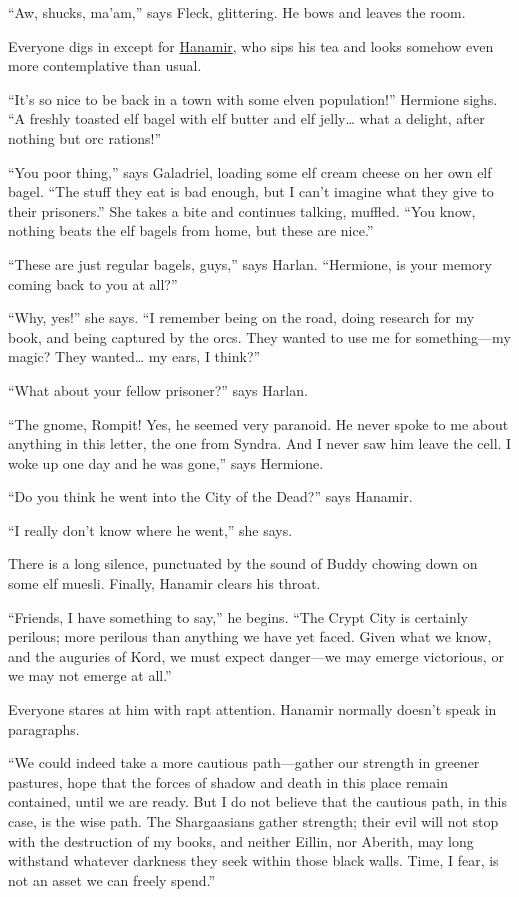 \documentclass[smalldemyvopaper,11pt,twoside,onecolumn,openright,extrafontsizes]{memoir}
\begin{document}
``Aw, shucks, ma'am,'' says Fleck, glittering. He bows and leaves the
room.

Everyone digs in except for \href{/characters/hanamir/}{Hanamir}, who
sips his tea and looks somehow even more contemplative than usual.

``It's so nice to be back in a town with some elven population!''
Hermione sighs. ``A freshly toasted elf bagel with elf butter and elf
jelly\ldots{} what a delight, after nothing but orc rations!''

``You poor thing,'' says Galadriel, loading some elf cream cheese on her
own elf bagel. ``The stuff they eat is bad enough, but I can't imagine
what they give to their prisoners.'' She takes a bite and continues
talking, muffled. ``You know, nothing beats the elf bagels from home,
but these are nice.''

``These are just regular bagels, guys,'' says Harlan. ``Hermione, is
your memory coming back to you at all?''

``Why, yes!'' she says. ``I remember being on the road, doing research
for my book, and being captured by the orcs. They wanted to use me for
something---my magic? They wanted\ldots{} my ears, I think?''

``What about your fellow prisoner?'' says Harlan.

``The gnome, Rompit! Yes, he seemed very paranoid. He never spoke to me
about anything in this letter, the one from Syndra. And I never saw him
leave the cell. I woke up one day and he was gone,'' says Hermione.

``Do you think he went into the City of the Dead?'' says Hanamir.

``I really don't know where he went,'' she says.

There is a long silence, punctuated by the sound of Buddy chowing down
on some elf muesli. Finally, Hanamir clears his throat.

``Friends, I have something to say,'' he begins. ``The Crypt City is
certainly perilous; more perilous than anything we have yet faced. Given
what we know, and the auguries of Kord, we must expect danger---we may
emerge victorious, or we may not emerge at all.''

Everyone stares at him with rapt attention. Hanamir normally doesn't
speak in paragraphs.

``We could indeed take a more cautious path---gather our strength in
greener pastures, hope that the forces of shadow and death in this place
remain contained, until we are ready. But I do not believe that the
cautious path, in this case, is the wise path. The Shargaasians gather
strength; their evil will not stop with the destruction of my books, and
neither Eillin, nor Aberith, may long withstand whatever darkness they
seek within those black walls. Time, I fear, is not an asset we can
freely spend.''
\end{document}
